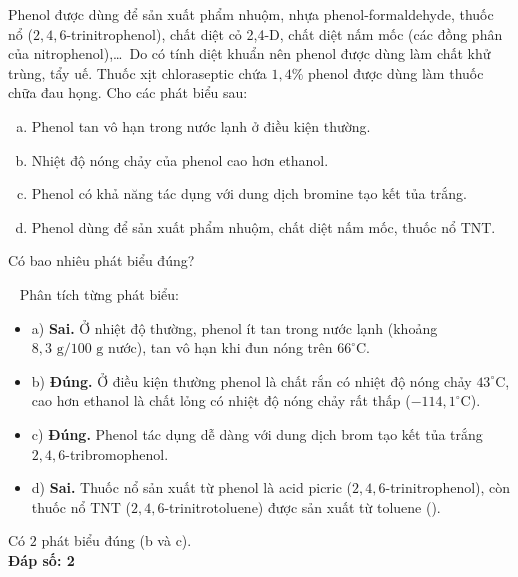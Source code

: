 \documentclass[12pt,a4paper]{article}
\renewcommand{\loigiai}[1]{%
  \par\smallskip\noindent{\color{blue!80!black}\textbf{Lời giải:}}\ #1\par\smallskip
}
\begin{document}
\begin{ex}
Phenol được dùng để sản xuất phẩm nhuộm, nhựa phenol-formaldehyde, thuốc nổ ($2{,}4{,}6$-trinitrophenol), chất diệt cỏ 2,4-D, chất diệt nấm mốc (các đồng phân của nitrophenol),\dots\ Do có tính diệt khuẩn nên phenol được dùng làm chất khử trùng, tẩy uế. Thuốc xịt chloraseptic chứa $1{,}4\%$ phenol được dùng làm thuốc chữa đau họng. Cho các phát biểu sau:
\begin{enumerate}[a)]
	\item Phenol tan vô hạn trong nước lạnh ở điều kiện thường.
	\item Nhiệt độ nóng chảy của phenol cao hơn ethanol.
	\item Phenol có khả năng tác dụng với dung dịch bromine tạo kết tủa trắng.
	\item Phenol dùng để sản xuất phẩm nhuộm, chất diệt nấm mốc, thuốc nổ TNT.
\end{enumerate}
Có bao nhiêu phát biểu đúng?
\par{}
\loigiai{
Phân tích từng phát biểu:
\begin{itemize}
  \item a) \textbf{Sai.} Ở nhiệt độ thường, phenol ít tan trong nước lạnh (khoảng $8{,}3\text{ g}/100\text{ g nước}$), tan vô hạn khi đun nóng trên $66^\circ\text{C}$.
  \item b) \textbf{Đúng.} Ở điều kiện thường phenol là chất rắn có nhiệt độ nóng chảy $43^\circ\text{C}$, cao hơn ethanol là chất lỏng có nhiệt độ nóng chảy rất thấp ($-114{,}1^\circ\text{C}$).
  \item c) \textbf{Đúng.} Phenol tác dụng dễ dàng với dung dịch brom tạo kết tủa trắng $2,4,6$-tribromophenol.
  \item d) \textbf{Sai.} Thuốc nổ sản xuất từ phenol là acid picric ($2,4,6$-trinitrophenol), còn thuốc nổ TNT ($2,4,6$-trinitrotoluene) được sản xuất từ toluene (\ce{C7H8}).
\end{itemize}
Có $2$ phát biểu đúng (b và c).\\
\textbf{Đáp số: 2}
}
\end{ex}
\end{document}
